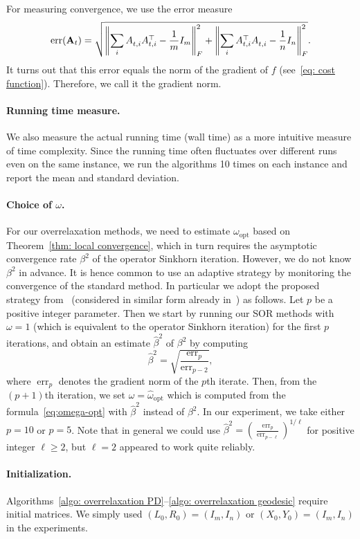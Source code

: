 \documentclass[a4paper]{article}
\newcommand{\bA}{\mathbf{A}}
\DeclareMathOperator{\err}{err}
\DeclarePairedDelimiter{\norm}{\lVert}{\rVert}
\theoremstyle{definition}
\numberwithin{equation}{section}
\begin{document}
For measuring convergence, we use the error measure 
\[
 \err(\bA_t) = \sqrt{\norm*{\sum_i A_{t,i}^{} A_{t,i}^\top - \frac{1}{m}I_m}_F^2 + \norm*{\sum_i A_{t,i}^\top A_{t,i}^{} - \frac{1}{n}I_n}_F^2}.
\]
It turns out that this error equals the norm of the gradient of $f$ (see~\eqref{eq: cost function}). Therefore, we call it the gradient norm.

\paragraph{Running time measure.}
We also measure the actual running time (wall time) as a more intuitive measure of time complexity. Since the running time often fluctuates over different runs even on the same instance, we run the algorithms 10 times on each instance and report the mean and standard deviation.

\paragraph{Choice of $\omega$.}
For our overrelaxation methods, we need to estimate $\omega_{\mathrm{opt}}$ based on Theorem~\ref{thm: local convergence}, which in turn requires the asymptotic convergence rate $\beta^2$ of the operator Sinkhorn iteration. However, we do not know $\beta^2$ in advance. It is hence common to use an adaptive strategy by monitoring the convergence of the standard method. In particular we adopt the proposed strategy from~\cite{Lehmann2022,Oseledets2023} (considered in similar form already in~\cite{Hageman1975}) as follows. Let $p$ be a positive integer parameter. Then we start by running our SOR methods with $\omega=1$ (which is equivalent to the operator Sinkhorn iteration) for the first $p$ iterations, and obtain an estimate ${\hat \beta}^2$ of $\beta^2$ by computing
\[
 {\hat \beta}^2 = \sqrt{\frac{\err_p}{\err_{p-2}}},
\]
where $\err_p$ denotes the gradient norm of the $p$th iterate. Then, from the $(p+1)$th iteration, we set $\omega = \hat{\omega}_{\mathrm{opt}}$ which is computed from the formula~\eqref{eq:omega-opt} with ${\hat \beta}^2$ instead of $\beta^2$. In our experiment, we take either $p = 10$ or $p = 5$. Note that in general we could use ${\hat \beta}^2 = (\frac{\err_p}{\err_{p-\ell}} )^{1/\ell}$ for positive integer $\ell \geq 2$, but $\ell = 2$ appeared to work quite reliably.

\paragraph{Initialization.} Algorithms~\ref{algo: overrelaxation PD}--\ref{algo: overrelaxation geodesic} require initial matrices. We simply used $(L_0, R_0) = (I_m, I_n)$ or $(X_0, Y_0) = (I_m, I_n)$ in the experiments.
\end{document}
